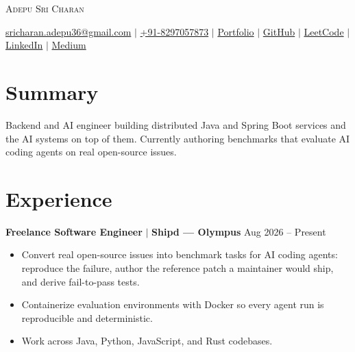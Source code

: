 \documentclass[letterpaper,10pt]{article}
\begin{document}

\begin{center}
{\Huge \scshape Adepu Sri Charan} \\ \vspace{3pt}

\href{mailto:sricharan.adepu36@gmail.com}{sricharan.adepu36@gmail.com} $|$
\href{tel:+918297057873}{+91-8297057873} $|$
\href{https://adepusricharan.github.io/portfolio/}{Portfolio} $|$
\href{https://github.com/AdepuSriCharan}{GitHub} $|$
\href{https://leetcode.com/u/Adepu_Sri_Charan/}{LeetCode} $|$
\href{https://www.linkedin.com/in/adepu-sri-charan-b6b0b2298/}{LinkedIn} $|$
\href{https://medium.com/@sricharan.adepu36}{Medium}
\end{center}

\vspace{-6pt}


\section{Summary}

\vspace{2pt}
Backend and AI engineer building distributed Java and Spring Boot services and the AI systems on top of them. Currently authoring benchmarks that evaluate AI coding agents on real open-source issues.

\vspace{-4pt}


\section{Experience}

\textbf{Freelance Software Engineer} $|$ \textbf{Shipd --- Olympus} \hfill Aug 2026 -- Present

\begin{itemize}[leftmargin=*, itemsep=0pt, topsep=2pt]
\item Convert real open-source issues into benchmark tasks for AI coding agents: reproduce the failure, author the reference patch a maintainer would ship, and derive fail-to-pass tests.
\item Containerize evaluation environments with Docker so every agent run is reproducible and deterministic.
\item Work across Java, Python, JavaScript, and Rust codebases.
\end{itemize}
\end{document}
